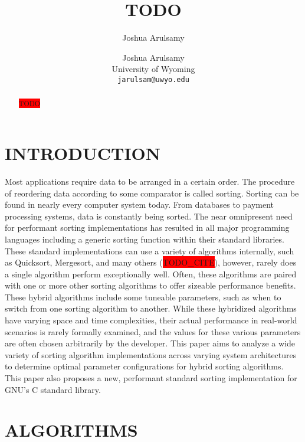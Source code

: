 \documentclass[letter, 12pt, conference]{ieeeconf}
\title{\LARGE \bf TODO}
\author{Joshua Arulsamy}
\author{\parbox{3 in}{
	\centering
	Joshua Arulsamy\\
    University of Wyoming\\
    {\tt\small jarulsam@uwyo.edu}}}
\newcommand{\todo}{\colorbox{red}{TODO}}
\newcommand{\todocite}{\colorbox{red}{TODO\_CITE}}
\begin{document}
\maketitle
\thispagestyle{plain}
\pagestyle{plain}
\nocite{*}

\begin{abstract}

  \todo

\end{abstract}

\section{INTRODUCTION}

Most applications require data to be arranged in a certain order. The procedure
of reordering data according to some comparator is called sorting. Sorting can
be found in nearly every computer system today. From databases to payment
processing systems, data is constantly being sorted. The near omnipresent need
for performant sorting implementations has resulted in all major programming
languages including a generic sorting function within their standard libraries.
These standard implementations can use a variety of algorithms internally, such
as Quicksort, Mergesort, and many others (\todocite), however, rarely does a
single algorithm perform exceptionally well. Often, these algorithms are paired
with one or more other sorting algorithms to offer sizeable performance
benefits. These hybrid algorithms include some tuneable parameters, such as when
to switch from one sorting algorithm to another. While these hybridized
algorithms have varying space and time complexities, their actual performance in
real-world scenarios is rarely formally examined, and the values for these
various parameters are often chosen arbitrarily by the developer. This paper
aims to analyze a wide variety of sorting algorithm implementations across
varying system architectures to determine optimal parameter configurations for
hybrid sorting algorithms. This paper also proposes a new, performant standard
sorting implementation for GNU's C standard library.

\section{ALGORITHMS}
\end{document}

